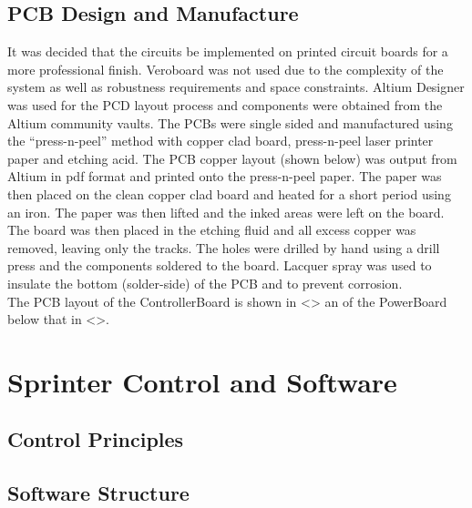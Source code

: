   \subsection{PCB Design and Manufacture}
  \label{sub:PCB Design and Manufacture}
    It was decided that the circuits be implemented on printed circuit boards for a more professional finish. Veroboard was not used due to the complexity of the system as well as robustness requirements and space constraints. Altium Designer was used for the PCD layout process and components were obtained from the Altium community vaults. The PCBs were single sided and manufactured using the ``press-n-peel'' method with copper clad board, press-n-peel laser printer paper and etching acid. The PCB copper layout (shown below) was output from Altium in pdf format and printed onto the press-n-peel paper. The paper was then placed on the clean copper clad board and heated for a short period using an iron. The paper was then lifted and the inked areas were left on the board. The board was then placed in the etching fluid and all excess copper was removed, leaving only the tracks. The holes were drilled by hand using a drill press and the components soldered to the board. Lacquer spray was used to insulate the bottom (solder-side) of the PCB and to prevent corrosion.\\

    The PCB layout of the ControllerBoard is shown in <> an of the PowerBoard below that in <>.




\clearpage
\section{Sprinter Control and Software}
\label{sec:Sprinter Control and Software}
  \subsection{Control Principles}
  \label{sub:Control Principles}
  \subsection{Software Structure}
  \label{sub:Software Structure}


\clearpage
